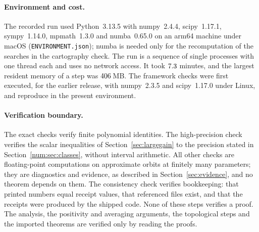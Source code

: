 \paragraph{Environment and cost.}
\begin{sloppypar}\noindent The recorded run used Python~3.13.5 with numpy~2.4.4, scipy~1.17.1, sympy~1.14.0, mpmath~1.3.0 and numba~0.65.0 on an arm64 machine under macOS (\texttt{ENVIRONMENT.json}); numba is needed only for the recomputation of the searches in the cartography check. The run is a sequence of single processes with one thread each and uses no network access. It took $7.3$ minutes, and the largest resident memory of a step was $406$\,MB. The framework checks were first executed, for the earlier release, with numpy~2.3.5 and scipy~1.17.0 under Linux, and reproduce in the present environment.\end{sloppypar}

\paragraph{Verification boundary.}
The exact checks verify finite polynomial identities. The high-precision check verifies the scalar inequalities of Section~\ref{sec:largegain} to the precision stated in Section~\ref{num:sec:classes}, without interval arithmetic. All other checks are floating-point computations on approximate orbits at finitely many parameters; they are diagnostics and evidence, as described in Section~\ref{sec:evidence}, and no theorem depends on them. The consistency check verifies bookkeeping: that printed numbers equal receipt values, that referenced files exist, and that the receipts were produced by the shipped code. None of these steps verifies a proof. The analysis, the positivity and averaging arguments, the topological steps and the imported theorems are verified only by reading the proofs.
